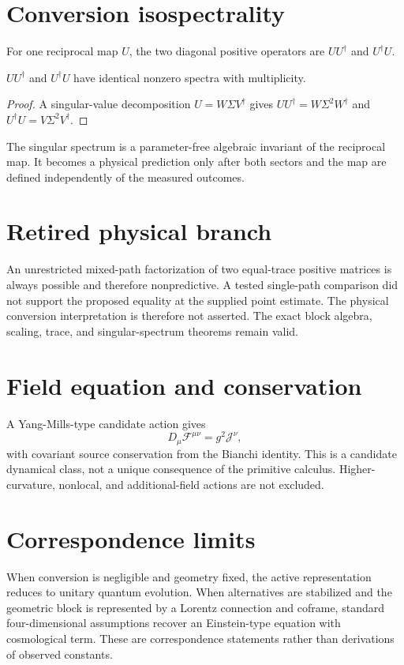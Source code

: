 \documentclass[11pt,a4paper]{article}
\begin{document}
\section{Conversion isospectrality}
For one reciprocal map $U$, the two diagonal positive operators are $UU^\dagger$ and $U^\dagger U$.
\begin{theorem}
$UU^\dagger$ and $U^\dagger U$ have identical nonzero spectra with multiplicity.
\end{theorem}
\begin{proof}
A singular-value decomposition $U=W\Sigma V^\dagger$ gives $UU^\dagger=W\Sigma^2W^\dagger$ and $U^\dagger U=V\Sigma^2V^\dagger$.
\end{proof}
The singular spectrum is a parameter-free algebraic invariant of the reciprocal map. It becomes a physical prediction only after both sectors and the map are defined independently of the measured outcomes.

\section{Retired physical branch}
An unrestricted mixed-path factorization of two equal-trace positive matrices is always possible and therefore nonpredictive. A tested single-path comparison did not support the proposed equality at the supplied point estimate. The physical conversion interpretation is therefore not asserted. The exact block algebra, scaling, trace, and singular-spectrum theorems remain valid.

\section{Field equation and conservation}
A Yang-Mills-type candidate action gives
\begin{equation}
D_\mu\mathcal F^{\mu\nu}=g^2\mathcal J^\nu,
\end{equation}
with covariant source conservation from the Bianchi identity. This is a candidate dynamical class, not a unique consequence of the primitive calculus. Higher-curvature, nonlocal, and additional-field actions are not excluded.

\section{Correspondence limits}
When conversion is negligible and geometry fixed, the active representation reduces to unitary quantum evolution. When alternatives are stabilized and the geometric block is represented by a Lorentz connection and coframe, standard four-dimensional assumptions recover an Einstein-type equation with cosmological term. These are correspondence statements rather than derivations of observed constants.
\end{document}
